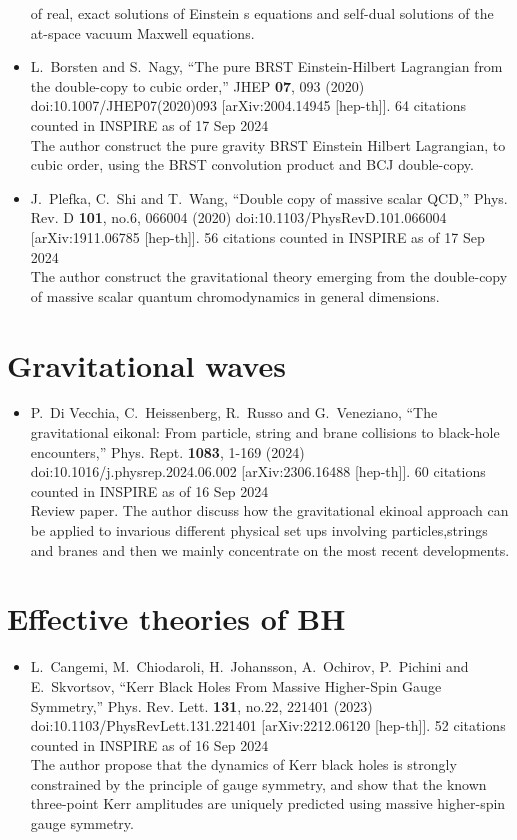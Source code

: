 \documentclass[a4paper,12pt]{article}
\begin{document}
\begin{itemize}
    of real, exact solutions of Einstein s equations and self-dual solutions of the at-space vacuum Maxwell equations.
    \item %
    L.~Borsten and S.~Nagy,
    ``The pure BRST Einstein-Hilbert Lagrangian from the double-copy to cubic order,''
    JHEP \textbf{07}, 093 (2020)
    doi:10.1007/JHEP07(2020)093
    [arXiv:2004.14945 [hep-th]].
    64 citations counted in INSPIRE as of 17 Sep 2024\\
    The author construct the pure gravity BRST Einstein Hilbert Lagrangian, to cubic order, using the BRST convolution product and BCJ double-copy.
    \item  %
    J.~Plefka, C.~Shi and T.~Wang,
    ``Double copy of massive scalar QCD,''
    Phys. Rev. D \textbf{101}, no.6, 066004 (2020)
    doi:10.1103/PhysRevD.101.066004
    [arXiv:1911.06785 [hep-th]].
    56 citations counted in INSPIRE as of 17 Sep 2024\\
    The author construct the gravitational theory emerging from the double-copy of massive scalar quantum
    chromodynamics in general dimensions. 
\end{itemize}
\section*{Gravitational waves}
\begin{itemize}
    \item %
    P.~Di Vecchia, C.~Heissenberg, R.~Russo and G.~Veneziano,
    ``The gravitational eikonal: From particle, string and brane collisions to black-hole encounters,''
    Phys. Rept. \textbf{1083}, 1-169 (2024)
    doi:10.1016/j.physrep.2024.06.002
    [arXiv:2306.16488 [hep-th]].
    60 citations counted in INSPIRE as of 16 Sep 2024\\
    Review paper. The author discuss how the gravitational ekinoal approach can be applied to invarious different physical
    set ups involving particles,strings and branes and then we mainly concentrate on the most recent
    developments.
    
\end{itemize}
\section*{Effective theories of BH}
\begin{itemize}
    \item %
    L.~Cangemi, M.~Chiodaroli, H.~Johansson, A.~Ochirov, P.~Pichini and E.~Skvortsov,
    ``Kerr Black Holes From Massive Higher-Spin Gauge Symmetry,''
    Phys. Rev. Lett. \textbf{131}, no.22, 221401 (2023)
    doi:10.1103/PhysRevLett.131.221401
    [arXiv:2212.06120 [hep-th]].
    52 citations counted in INSPIRE as of 16 Sep 2024\\
    The author propose that the dynamics of Kerr black holes is strongly constrained by the principle of
    gauge symmetry, and show that the known three-point Kerr amplitudes are uniquely
    predicted using massive higher-spin gauge symmetry.
\end{itemize}
\end{document}
